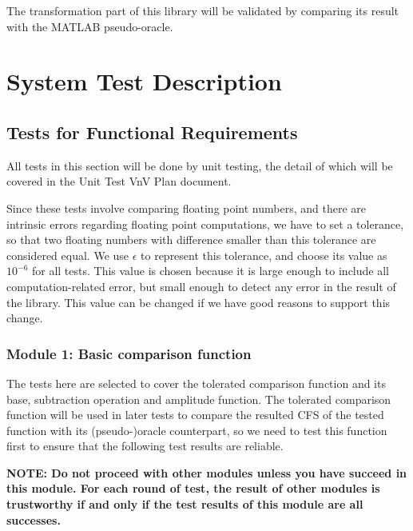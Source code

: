 \documentclass[12pt, titlepage]{article}
\begin{document}
The transformation part of this library will be validated by comparing its
result with the MATLAB pseudo-oracle. 

\section{System Test Description}
	
\subsection{Tests for Functional Requirements} All tests in this section will be
done by unit testing, the detail of which will be covered in the Unit Test VnV
Plan document.

Since these tests involve comparing floating point numbers, and there are
intrinsic errors regarding floating point computations, we have to set a
tolerance, so that two floating numbers with difference smaller than this
tolerance are considered equal. We use $\epsilon$ to represent this tolerance,
and choose its value as $10^{-6}$ for all tests. This value is chosen because it
is large enough to include all computation-related error, but small enough to
detect any error in the result of the library. This value can be changed if we
have good reasons to support this change.  

\subsubsection{Module 1: Basic comparison function}

The tests here are selected to cover the tolerated comparison function and its
base, subtraction operation and amplitude function. The tolerated comparison
function will be used in later tests to compare the resulted CFS of the tested
function with its (pseudo-)oracle counterpart, so we need to test this function
first to ensure that the following test results are reliable.

\textbf{NOTE: Do not proceed with other modules unless you have succeed in this
module. For each round of test, the result of other modules is trustworthy if
and only if the test results of this module are all successes.}
\end{document}
